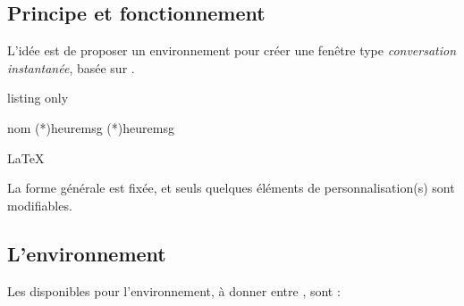 \documentclass[french,11pt,a4paper]{article}
\begin{document}
\subsection{Principe et fonctionnement}

L'idée est de proposer un environnement pour créer une fenêtre type \textit{conversation instantanée}, basée sur .

\begin{DemoCode}{listing only}
\begin{EnvSMS}[Clés]{nom}
  \SMSrec(*){heure}{msg}
  \SMSenv(*){heure}{msg}
\end{EnvSMS}
\end{DemoCode}

\begin{DemoCode}{}
\begin{EnvSMS}{\LaTeX}
\end{EnvSMS}
\end{DemoCode}

La forme générale est fixée, et seuls quelques éléments de personnalisation(s) sont modifiables.

\subsection{L'environnement}

Les  disponibles pour l'environnement, à donner entre \MontreCode{[...]}, sont :
\end{document}
